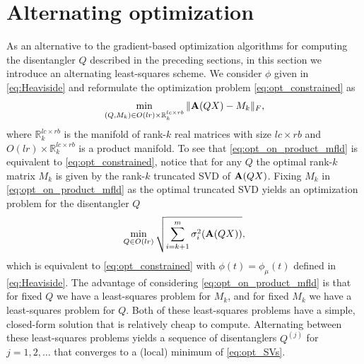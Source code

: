 \documentclass[pdflatex,sn-mathphys-num]{sn-jnl}
\newcounter{thm}[section]
\newcommand{\bfA}[1]{{\textbf A}(#1)}
\begin{document}
\section{Alternating optimization}
\label{sec:altopt}
As an alternative to the gradient-based optimization algorithms for computing the disentangler $Q$ described in the preceding sections, in this section we introduce an alternating least-squares scheme. We consider $\phi$ given in \eqref{eq:Heaviside} and reformulate the optimization problem \eqref{eq:opt_constrained} as 
\begin{equation} \label{eq:opt_on_product_mfld}
\min_{(Q,M_k) \in O(lr) \times \mathbb{R}_k^{lc \times rb}} 
\|  {\bf A} (QX) - M_k \|_F, 
\end{equation}
where $\mathbb{R}_k^{lc \times rb}$ is the manifold of rank-$k$ real matrices with size $lc \times rb$ and $O(lr) \times \mathbb{R}_k^{lc \times rb}$ is a product manifold. 
To see that \eqref{eq:opt_on_product_mfld} is equivalent to \eqref{eq:opt_constrained}, notice that for any $Q$ the optimal rank-$k$ matrix $M_k$ is given by the rank-$k$ truncated SVD of $\bfA{QX}$.  Fixing $M_k$ in \eqref{eq:opt_on_product_mfld} as the optimal truncated SVD yields an optimization problem for the disentangler $Q$ 
\begin{equation}
\label{eq:opt_SVs}
\begin{aligned}
\min_{Q \in O(lr)}\sqrt{ \sum_{i = k+1}^{m} \sigma_i^2(\bfA{QX})}, 
\end{aligned}
\end{equation}
%
which is equivalent to \eqref{eq:opt_constrained} with $\phi(t)=\phi_{\mu}(t)$ defined in \eqref{eq:Heaviside}. The advantage of considering \eqref{eq:opt_on_product_mfld} is that for fixed $Q$ we have a least-squares problem for $M_k$, and for fixed $M_k$ we have a least-squares problem for $Q$. Both of these least-squares problems have a simple, closed-form solution that is relatively cheap to compute. Alternating between these least-squares problems yields a sequence of disentanglers $Q^{(j)}$ for $j=1,2,\ldots$ that converges to a (local) minimum of \eqref{eq:opt_SVs}. 
\end{document}
